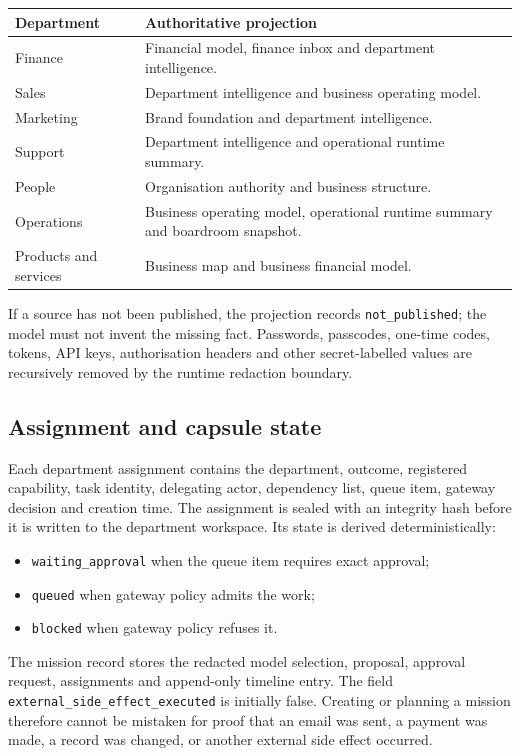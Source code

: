 \begin{longtable}{p{.22\linewidth}p{.70\linewidth}}
\textbf{Department} & \textbf{Authoritative projection}\\ \hline
Finance & Financial model, finance inbox and department intelligence.\\
Sales & Department intelligence and business operating model.\\
Marketing & Brand foundation and department intelligence.\\
Support & Department intelligence and operational runtime summary.\\
People & Organisation authority and business structure.\\
Operations & Business operating model, operational runtime summary and boardroom snapshot.\\
Products and services & Business map and business financial model.\\
\end{longtable}

If a source has not been published, the projection records
\texttt{not\_published}; the model must not invent the missing fact. Passwords,
passcodes, one-time codes, tokens, API keys, authorisation headers and other
secret-labelled values are recursively removed by the runtime redaction
boundary.

\subsection*{Assignment and capsule state}

Each department assignment contains the department, outcome, registered
capability, task identity, delegating actor, dependency list, queue item,
gateway decision and creation time. The assignment is sealed with an integrity
hash before it is written to the department workspace. Its state is derived
deterministically:

\begin{itemize}[leftmargin=*]
\item \texttt{waiting\_approval} when the queue item requires exact approval;
\item \texttt{queued} when gateway policy admits the work;
\item \texttt{blocked} when gateway policy refuses it.
\end{itemize}

The mission record stores the redacted model selection, proposal, approval
request, assignments and append-only timeline entry. The field
\texttt{external\_side\_effect\_executed} is initially false. Creating or
planning a mission therefore cannot be mistaken for proof that an email was
sent, a payment was made, a record was changed, or another external side
effect occurred.

